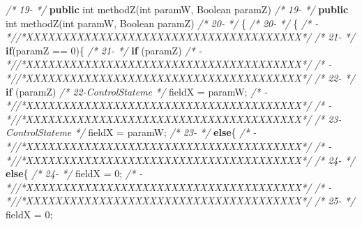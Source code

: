 \documentclass[
]{article}
\newenvironment{Shaded}{\begin{snugshade}}{\end{snugshade}}
\newcommand{\BuiltInTok}[1]{#1}
\newcommand{\CommentTok}[1]{\textcolor[rgb]{0.56,0.35,0.01}{\textit{#1}}}
\newcommand{\DataTypeTok}[1]{\textcolor[rgb]{0.13,0.29,0.53}{#1}}
\newcommand{\DecValTok}[1]{\textcolor[rgb]{0.00,0.00,0.81}{#1}}
\newcommand{\FunctionTok}[1]{\textcolor[rgb]{0.00,0.00,0.00}{#1}}
\newcommand{\KeywordTok}[1]{\textcolor[rgb]{0.13,0.29,0.53}{\textbf{#1}}}
\newcommand{\NormalTok}[1]{#1}
\begin{document}
\begin{landscape}
\begin{Shaded}
\begin{Highlighting}[]
\CommentTok{/* 19-                 */}    \KeywordTok{public} \DataTypeTok{int} \FunctionTok{methodZ}\NormalTok{(}\DataTypeTok{int}\NormalTok{ paramW, }\BuiltInTok{Boolean}\NormalTok{ paramZ)             }\CommentTok{/* 19-                 */}    \KeywordTok{public} \DataTypeTok{int} \FunctionTok{methodZ}\NormalTok{(}\DataTypeTok{int}\NormalTok{ paramW, }\BuiltInTok{Boolean}\NormalTok{ paramZ)             }
\CommentTok{/* 20-                 */}\NormalTok{    \{                                                          }\CommentTok{/* 20-                 */}\NormalTok{    \{                                                          }
\CommentTok{/*   -                 *//*XXXXXXXXXXXXXXXXXXXXXXXXXXXXXXXXXXXXXX*/}                     \CommentTok{/* 21-                 */}       \KeywordTok{if}\NormalTok{(paramZ == }\DecValTok{0}\NormalTok{)\{                                               }
\CommentTok{/* 21-                 */}        \KeywordTok{if}\NormalTok{ (paramZ)                                            }\CommentTok{/*   -                 *//*XXXXXXXXXXXXXXXXXXXXXXXXXXXXXXXXXXXXXX*/}                     
\CommentTok{/*   -                 *//*XXXXXXXXXXXXXXXXXXXXXXXXXXXXXXXXXXXXXX*/}                     \CommentTok{/* 22-                 */}            \KeywordTok{if}\NormalTok{ (paramZ)                                        }
\CommentTok{/* 22-ControlStateme   */}\NormalTok{            fieldX = paramW;                                   }\CommentTok{/*   -                 *//*XXXXXXXXXXXXXXXXXXXXXXXXXXXXXXXXXXXXXX*/}                     
\CommentTok{/*   -                 *//*XXXXXXXXXXXXXXXXXXXXXXXXXXXXXXXXXXXXXX*/}                     \CommentTok{/* 23-ControlStateme   */}\NormalTok{                fieldX = paramW;                               }
\CommentTok{/* 23-                 */}        \KeywordTok{else}\NormalTok{\{                                                  }\CommentTok{/*   -                 *//*XXXXXXXXXXXXXXXXXXXXXXXXXXXXXXXXXXXXXX*/}                     
\CommentTok{/*   -                 *//*XXXXXXXXXXXXXXXXXXXXXXXXXXXXXXXXXXXXXX*/}                     \CommentTok{/* 24-                 */}            \KeywordTok{else}\NormalTok{\{                                              }
\CommentTok{/* 24-                 */}\NormalTok{            fieldX = }\DecValTok{0}\NormalTok{;                                        }\CommentTok{/*   -                 *//*XXXXXXXXXXXXXXXXXXXXXXXXXXXXXXXXXXXXXX*/}                     
\CommentTok{/*   -                 *//*XXXXXXXXXXXXXXXXXXXXXXXXXXXXXXXXXXXXXX*/}                     \CommentTok{/* 25-                 */}\NormalTok{                fieldX = }\DecValTok{0}\NormalTok{;                                    }

\end{Highlighting}
\end{Shaded}
\end{landscape}
\end{document}
